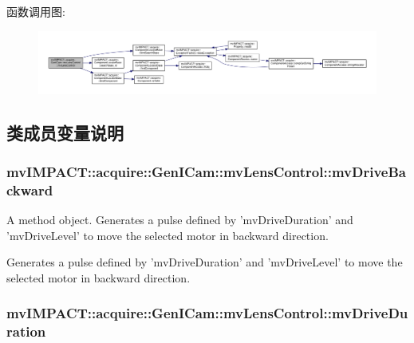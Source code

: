 函数调用图\+:
\nopagebreak
\begin{figure}[H]
\begin{center}
\leavevmode
\includegraphics[width=350pt]{classmv_i_m_p_a_c_t_1_1acquire_1_1_gen_i_cam_1_1mv_lens_control_a3a0edfeb5e8b583cb69f12ee85db2e76_cgraph}
\end{center}
\end{figure}




\subsection{类成员变量说明}
\hypertarget{classmv_i_m_p_a_c_t_1_1acquire_1_1_gen_i_cam_1_1mv_lens_control_a6299fe531c5cf9275c981adf5a5c8c69}{
\subsubsection[{mv\+Drive\+Backward}]{ mv\+I\+M\+P\+A\+C\+T\+::acquire\+::\+Gen\+I\+Cam\+::mv\+Lens\+Control\+::mv\+Drive\+Backward}}\label{classmv_i_m_p_a_c_t_1_1acquire_1_1_gen_i_cam_1_1mv_lens_control_a6299fe531c5cf9275c981adf5a5c8c69}


A method object. Generates a pulse defined by 'mv\+Drive\+Duration' and 'mv\+Drive\+Level' to move the selected motor in backward direction. 

Generates a pulse defined by 'mv\+Drive\+Duration' and 'mv\+Drive\+Level' to move the selected motor in backward direction. \hypertarget{classmv_i_m_p_a_c_t_1_1acquire_1_1_gen_i_cam_1_1mv_lens_control_ab549cd58a4cc4f210c47c6868f5ec5d9}{
\subsubsection[{mv\+Drive\+Duration}]{ mv\+I\+M\+P\+A\+C\+T\+::acquire\+::\+Gen\+I\+Cam\+::mv\+Lens\+Control\+::mv\+Drive\+Duration}}\label{classmv_i_m_p_a_c_t_1_1acquire_1_1_gen_i_cam_1_1mv_lens_control_ab549cd58a4cc4f210c47c6868f5ec5d9}


